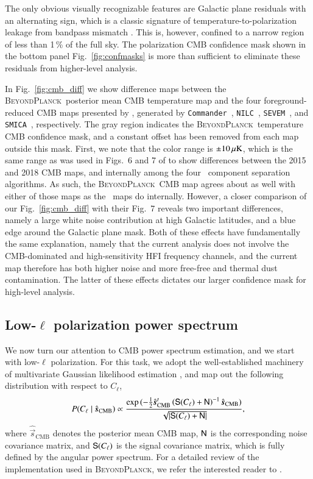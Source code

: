 \documentclass[twocolumn]{aa}
\def\commander{\texttt{Commander}}
\def\nilc{\texttt{NILC}}
\def\sevem{\texttt{SEVEM}}
\def\smica{\texttt{SMICA}}
\newcommand{\s}[0]{\vec{s}}
\newcommand{\N}[0]{\tens{N}}
\renewcommand{\S}[0]{\tens{S}}
\newcommand{\BP}{\textsc{BeyondPlanck}}
\begin{document}
The only obvious visually recognizable features are Galactic plane
residuals with an alternating sign, which is a classic signature of
temperature-to-polarization leakage from bandpass mismatch
\citep{bp09}. This is, however, confined to a narrow region of less
than 1\,\% of the full sky. The polarization CMB confidence mask shown
in the bottom panel Fig.~\ref{fig:confmasks} is more than
sufficient to eliminate these residuals from higher-level analysis.

In Fig.~\ref{fig:cmb_diff} we show difference maps between the
\BP\ posterior mean CMB temperature map and the four
foreground-reduced CMB maps presented by \citet{planck2016-l04},
generated by \commander\ \citep{eriksen2008},
\nilc\ \citep{2012MNRAS.419.1163B, 2013MNRAS.435...18B},
\sevem\ \citep{leach2008,fernandez-cobos2012}, and
\smica\ \citep{cardoso2008}, respectively. The gray region indicates
the \BP\ temperature CMB confidence mask, and a constant offset has
been removed from each map outside this mask. First, we note that the
color range is $\pm10\muK$, which is the same range as was used in
Figs.~6 and 7 of \citet{planck2016-l04} to show differences between
the 2015 and 2018 CMB maps, and internally among the four
\Planck\ component separation algorithms. As such, the \BP\ CMB map
agrees about as well with either of those maps as the \Planck\ maps do
internally. However, a closer comparison of our
Fig.~\ref{fig:cmb_diff} with their Fig.~7 reveals two important
differences, namely a large white noise contribution at high Galactic
latitudes, and a blue edge around the Galactic plane mask. Both of
these effects have fundamentally the same explanation, namely that the
current analysis does not involve the CMB-dominated and
high-sensitivity HFI frequency channels, and the current map therefore
has both higher noise and more free-free and thermal dust
contamination. The latter of these effects dictates our larger
confidence mask for high-level analysis.


\subsection{Low-$\ell$ polarization power spectrum}

We now turn our attention to CMB power spectrum estimation, and we
start with low-$\ell$ polarization. For this task, we adopt the
well-established machinery of multivariate Gaussian likelihood
estimation
\citep[e.g.,][]{tegmark1997,page2007,planck2016-l05,gjerlow2015}, and
map out the following distribution with respect to $C_{\ell}$,
\begin{equation}
  \label{eq:gauss_like}
  P(C_\ell\mid\hat{\s}_{\mathrm{CMB}}) \propto \frac{\exp{(-\frac{1}{2}\hat{\s}_{\mathrm{CMB}}^t
  \left( \S(C_\ell)+\N \right)^{-1}\hat{\s}_{\mathrm{CMB}}})}{\sqrt{|\S(C_\ell)+\N|}},
\end{equation}
where $\hat{\s}_{\mathrm{CMB}}$ denotes the posterior mean CMB map,
$\N$ is the corresponding noise covariance matrix, and $\S(C_\ell)$ is
the signal covariance matrix, which is fully defined by the angular
power spectrum.  For a detailed review of the implementation used in
\BP, we refer the interested reader to \citet{bp12}.
\end{document}
